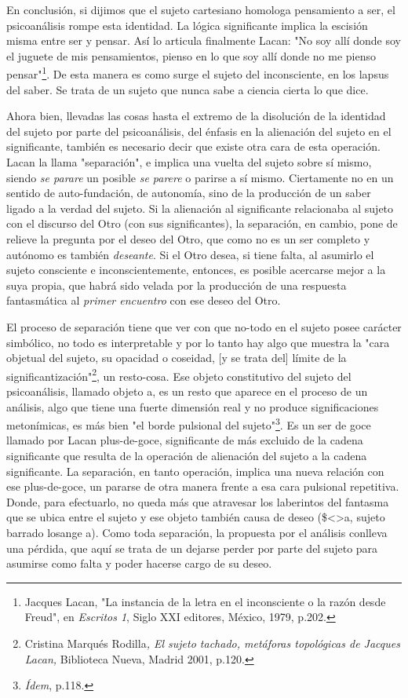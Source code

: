 En conclusión, si dijimos que el sujeto cartesiano homologa pensamiento
a ser, el psicoanálisis rompe esta identidad. La lógica significante
implica la escisión misma entre ser y pensar. Así lo articula finalmente
Lacan: "No soy allí donde soy el juguete de mis pensamientos, pienso en
lo que soy allí donde no me pienso pensar"\footnote{Jacques Lacan, "La
  instancia de la letra en el inconsciente o la razón desde Freud", en
  \emph{Escritos 1}, Siglo XXI editores, México, 1979, p.202.}. De esta
manera es como surge el sujeto del inconsciente, en los lapsus del
saber. Se trata de un sujeto que nunca sabe a ciencia cierta lo que
dice.

Ahora bien, llevadas las cosas hasta el extremo de la disolución de la
identidad del sujeto por parte del psicoanálisis, del énfasis en la
alienación del sujeto en el significante, también es necesario decir que
existe otra cara de esta operación. Lacan la llama "separación", e
implica una vuelta del sujeto sobre sí mismo, siendo \emph{se parare} un
posible \emph{se parere} o parirse a sí mismo. Ciertamente no en un
sentido de auto-fundación, de autonomía, sino de la producción de un
saber ligado a la verdad del sujeto. Si la alienación al significante
relacionaba al sujeto con el discurso del Otro (con sus significantes),
la separación, en cambio, pone de relieve la pregunta por el deseo del
Otro, que como no es un ser completo y autónomo es también
\emph{deseante}. Si el Otro desea, si tiene falta, al asumirlo el sujeto
consciente e inconscientemente, entonces, es posible acercarse mejor a
la suya propia, que habrá sido velada por la producción de una respuesta
fantasmática al \emph{primer encuentro} con ese deseo del Otro.

El proceso de separación tiene que ver con que no-todo en el sujeto
posee carácter simbólico, no todo es interpretable y por lo tanto hay
algo que muestra la "cara objetual del sujeto, su opacidad o coseidad,
{[}y se trata del{]} límite de la significantización"\footnote{Cristina
  Marqués Rodilla\emph{, El sujeto tachado, metáforas topológicas de
  Jacques Lacan,} Biblioteca Nueva, Madrid 2001, p.120.}, un resto-cosa.
Ese objeto constitutivo del sujeto del psicoanálisis, llamado objeto a,
es un resto que aparece en el proceso de un análisis, algo que tiene una
fuerte dimensión real y no produce significaciones metonímicas, es más
bien "el borde pulsional del sujeto"\footnote{\emph{Ídem}, p.118.}. Es
un ser de goce llamado por Lacan plus-de-goce, significante de más
excluido de la cadena significante que resulta de la operación de
alienación del sujeto a la cadena significante. La separación, en tanto
operación, implica una nueva relación con ese plus-de-goce, un pararse
de otra manera frente a esa cara pulsional repetitiva. Donde, para
efectuarlo, no queda más que atravesar los laberintos del fantasma que
se ubica entre el sujeto y ese objeto también causa de deseo
(\$\textless\textgreater a, sujeto barrado losange a). Como toda
separación, la propuesta por el análisis conlleva una pérdida, que aquí
se trata de un dejarse perder por parte del sujeto para asumirse como
falta y poder hacerse cargo de su deseo.

